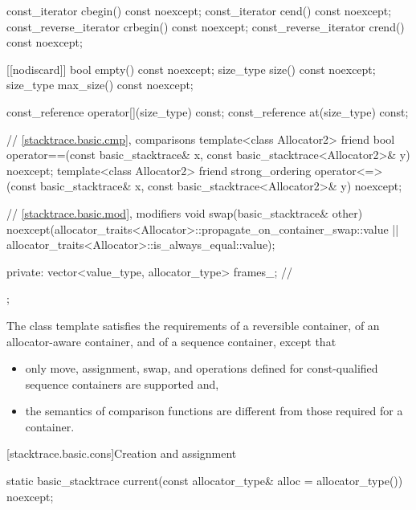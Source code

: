 \begin{codeblock}
{{    const_iterator cbegin() const noexcept;
    const_iterator cend() const noexcept;
    const_reverse_iterator crbegin() const noexcept;
    const_reverse_iterator crend() const noexcept;

    [[nodiscard]] bool empty() const noexcept;
    size_type size() const noexcept;
    size_type max_size() const noexcept;

    const_reference operator[](size_type) const;
    const_reference at(size_type) const;

    // \ref{stacktrace.basic.cmp}, comparisons
    template<class Allocator2>
    friend bool operator==(const basic_stacktrace& x,
                           const basic_stacktrace<Allocator2>& y) noexcept;
    template<class Allocator2>
    friend strong_ordering operator<=>(const basic_stacktrace& x,
                                       const basic_stacktrace<Allocator2>& y) noexcept;

    // \ref{stacktrace.basic.mod}, modifiers
    void swap(basic_stacktrace& other)
      noexcept(allocator_traits<Allocator>::propagate_on_container_swap::value ||
        allocator_traits<Allocator>::is_always_equal::value);

  private:
    vector<value_type, allocator_type> frames_;         // \expos
  };
}
\end{codeblock}

\pnum
The class template  satisfies
the requirements
of a reversible container,
of an allocator-aware container, and
of a sequence container,
except that
\begin{itemize}
\item
only move, assignment, swap, and
operations defined for const-qualified sequence containers are supported and,
\item
the semantics of comparison functions
are different from those required for a container.
\end{itemize}

[stacktrace.basic.cons]{Creation and assignment}

%
\begin{itemdecl}
static basic_stacktrace current(const allocator_type& alloc = allocator_type()) noexcept;
\end{itemdecl}

